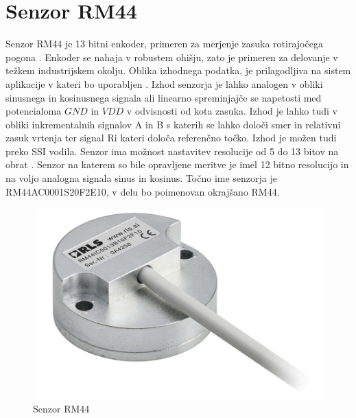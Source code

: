 \chapter{Senzor RM44}
Senzor RM44 je 13 bitni enkoder, primeren za merjenje zasuka rotirajočega pogona \cite{RM44}.
Enkoder se nahaja v robustem ohišju, zato je primeren za delovanje v težkem industrijskem okolju. %
Oblika izhodnega podatka, je prilagodljiva na sistem aplikacije v kateri bo uporabljen \cite{Ambrozic}. Izhod senzorja je lahko analogen v obliki sinusnega in kosinusnega signala ali linearno spreminjajče
se napetosti med potencialoma $GND$ in $VDD$ v odvisnosti od kota zasuka.
Izhod je lahko tudi v obliki inkrementalnih signalov A in B s katerih se lahko določi smer in relativni zasuk vrtenja ter signal Ri kateri določa referenčno točko. Izhod je možen tudi preko SSI vodila. Senzor ima
možnost nastavitev resolucije od 5 do 13 bitov na obrat \cite{AM8192} \cite{RM44}. Senzor na katerem so bile opravljene meritve je imel 12 bitno resolucijo in na voljo analogna signala sinus in kosinus. Točno ime senzorja je
RM44AC0001S20F2E10, v delu bo poimenovan okrajšano RM44.
\begin{figure}[ht]
	\centering
	\includegraphics[width=0.6\columnwidth]{./Slike/senzorRM44.jpg}
	\caption{Senzor RM44}
	\label{RM44}
\end{figure}

